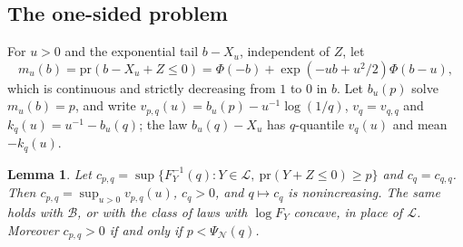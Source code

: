 \documentclass[12pt]{article}
\renewcommand{\_}{\usc\allowbreak}
\newtheorem{lemma}{Lemma}
\theoremstyle{definition}
\numberwithin{equation}{section}
\newcommand{\pr}{\mathrm{pr}}
\newcommand{\LC}{\mathcal{L}}
\newcommand{\B}{\mathcal{B}}
\newcommand{\N}{\mathcal{N}}
\begin{document}
\subsection{The one-sided problem}\label{sec:s-onesided}

For $u > 0$ and the exponential tail $b - X_u$, independent of $Z$, let
\[
m_u(b) = \pr(b - X_u + Z \le 0) = \Phi(-b) + \exp(-ub + u^2/2)\Phi(b - u),
\]
which is continuous and strictly decreasing from $1$ to $0$ in $b$. Let $b_u(p)$ solve $m_u(b) = p$, and write $v_{p,q}(u) = b_u(p) - u^{-1}\log(1/q)$, $v_q = v_{q,q}$ and $k_q(u) = u^{-1} - b_u(q)$; the law $b_u(q) - X_u$ has $q$-quantile $v_q(u)$ and mean $-k_q(u)$.

\begin{lemma}\label{lem:onesided}
Let $c_{p,q} = \sup\{F_Y^{-1}(q) : Y \in \LC,\ \pr(Y + Z \le 0) \ge p\}$ and $c_q = c_{q,q}$. Then $c_{p,q} = \sup_{u > 0}v_{p,q}(u)$, $c_q > 0$, and $q \mapsto c_q$ is nonincreasing. The same holds with $\B$, or with the class of laws with $\log F_Y$ concave, in place of $\LC$. Moreover $c_{p,q} > 0$ if and only if $p < \Psi_{\N}(q)$.
\end{lemma}
\end{document}
